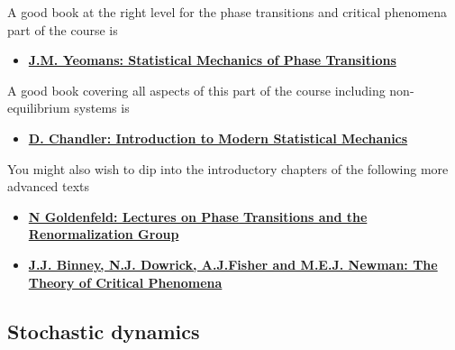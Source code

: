\documentclass[
  letterpaper,
  DIV=11,
  numbers=noendperiod]{scrreprt}
\providecommand{\tightlist}{%
  \setlength{\itemsep}{0pt}\setlength{\parskip}{0pt}}\usepackage{longtable,booktabs,array}
\begin{document}
A good book at the right level for the phase transitions and critical
phenomena part of the course is

\begin{itemize}
\tightlist
\item
  \textbf{\href{https://bris.on.worldcat.org/search/detail/24699159?queryString=yeomans\%20statistical&clusterResults=true&stickyFacetsChecked=true&groupVariantRecords=false&newsArticles=off&bookReviews=off}{J.M.
  Yeomans: Statistical Mechanics of Phase Transitions}}
\end{itemize}

A good book covering all aspects of this part of the course including
non-equilibrium systems is

\begin{itemize}
\tightlist
\item
  \textbf{\href{https://bris.on.worldcat.org/search/detail/941821555?queryString=chandler\%20statistical&clusterResults=true&stickyFacetsChecked=true&groupVariantRecords=false&newsArticles=off&bookReviews=off}{D.
  Chandler: Introduction to Modern Statistical Mechanics}}
\end{itemize}

You might also wish to dip into the introductory chapters of the
following more advanced texts

\begin{itemize}
\item
  \textbf{\href{https://bris.on.worldcat.org/search/detail/25914535?queryString=Lectures\%20on\%20Phase\%20Transitions\%20and\%20the\%20Renormalization\%20Group&clusterResults=true&stickyFacetsChecked=true&groupVariantRecords=false&newsArticles=off&bookReviews=off}{N
  Goldenfeld: Lectures on Phase Transitions and the Renormalization
  Group}}
\item
  \textbf{\href{https://bris.on.worldcat.org/search/detail/861559276?queryString=\%20The\%20Theory\%20of\%20Critical\%20Phenomena&clusterResults=true&stickyFacetsChecked=true&groupVariantRecords=false&newsArticles=off&bookReviews=off}{J.J.
  Binney, N.J. Dowrick, A.J.Fisher and M.E.J. Newman: The Theory of
  Critical Phenomena}}
\end{itemize}

\subsection*{Stochastic dynamics}\label{stochastic-dynamics}
\end{document}
